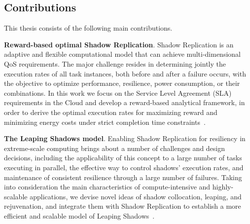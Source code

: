 \subsection{Contributions}
This thesis consists of the following main contributions.

\textbf{Reward-based optimal Shadow Replication}.
Shadow Replication is an adaptive and flexible computational model that can achieve multi-dimensional QoS requirements. 
The major challenge resides in determining jointly the execution rates of all task instances, 
both before and after a failure occurs, with the objective to optimize performance, resilience, power consumption, or their combinations.
In this work we focus on the Service Level Agreement (SLA) requirements in the Cloud and develop a reward-based analytical framework, in order to derive the optimal execution rates for maximizing reward and minimizing energy 
costs under strict completion time constraints~\cite{cui_2014_closer,cui_en7085151}. 


\textbf{The Leaping Shadows model}.
Enabling Shadow Replication for resiliency in extreme-scale computing brings about a number of challenges and design decisions, including the applicability of this concept to a large number of tasks executing in parallel, 
the effective way to control shadows’ execution rates, and maintenance of consistent resilience through a large number of failures. Taking into consideration the main characteristics of compute-intensive and 
highly-scalable applications, 
we devise novel ideas of shadow collocation, leaping, and rejuvenation, and integrate them with Shadow Replication to establish a more efficient and scalable model of Leaping Shadows~\cite{cui_2016_scalcom}.

